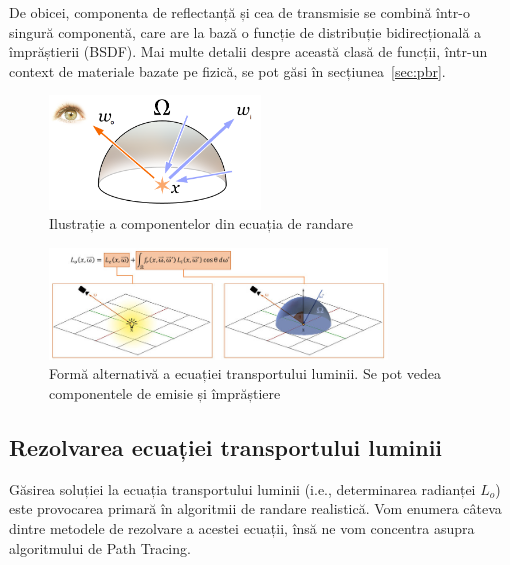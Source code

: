\documentclass[12pt,a4paper]{report}
\numberwithin{equation}{section} %
\begin{document}
De obicei, componenta de reflectanță și cea de transmisie se combină într-o singură
componentă, care are la bază o funcție de distribuție bidirecțională a împrăștierii (BSDF).
Mai multe detalii despre această clasă de funcții, într-un context de materiale
bazate pe fizică, se pot găsi în secțiunea~\ref{sec:pbr}.

\begin{figure}[ht]
	\centering
	\includegraphics[width=0.5\textwidth]{pics/rendering_eq2.png}
	\caption{Ilustrație a componentelor din ecuația de randare\protect{}}
	\label{fig:light_transport2}
\end{figure}

\begin{figure}[ht]
	\centering
	\includegraphics[width=0.8\textwidth]{pics/rendering_eq.png}
	\caption{Formă alternativă a ecuației transportului luminii. Se pot vedea componentele de emisie și împrăștiere\protect\footnotemark}
	\label{fig:light_transport}
\end{figure}

\subsection{Rezolvarea ecuației transportului luminii}

Găsirea soluției la ecuația transportului luminii (i.e., determinarea radianței $L_o$)
este provocarea primară în algoritmii de randare realistică. Vom enumera câteva dintre
metodele de rezolvare a acestei ecuații, însă ne vom concentra asupra algoritmului
de Path Tracing.
\end{document}
